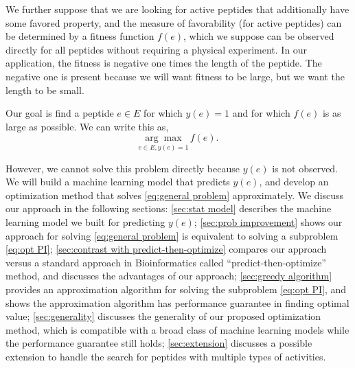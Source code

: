 \documentclass[11pt]{article}
\begin{document}
We further suppose that we are looking for active peptides that additionally have some
favored property, and the measure of favorability (for active peptides) can be
determined by a fitness function $f(e)$, which we suppose can be observed directly for all peptides without requiring a physical experiment. In our application, the fitness is negative one times the length of the peptide.  The negative one is present because we will want fitness to be large, but we want the length to be small.

Our goal is find a peptide $e\in E$ for which $y(e)=1$ and for which $f(e)$ is as large as possible.  We can write this as,
\begin{equation}
  \underset{e \in E, y(e) = 1}{\arg\max} \, f(e).
  \label{eq:general problem}
\end{equation}

However, we cannot solve this problem directly because $y(e)$ is not observed. We will build a machine learning model that predicts $y(e)$, and develop an optimization method that solves \eqref{eq:general problem} approximately. We discuss our approach in the following sections: 
\ref{sec:stat model} describes the machine learning model we built for predicting $y(e)$; 
\ref{sec:prob improvement} shows our approach for solving \eqref{eq:general problem} is equivalent to solving a subproblem \eqref{eq:opt PI};
\ref{sec:contrast with predict-then-optimize} compares our approach versus a standard approach in Bioinformatics called \enquote{predict-then-optimize} method, and discusses the advantages of our approach;
\ref{sec:greedy algorithm} provides an approximation algorithm for solving the subproblem \eqref{eq:opt PI}, and shows the approximation algorithm has performance guarantee in finding optimal value;
\ref{sec:generality} discusses the generality of our proposed optimization method, which is compatible with a broad class of machine learning models while the performance guarantee still holds;
\ref{sec:extension} discusses a possible extension to handle the search for peptides with multiple types of activities.
\end{document}
